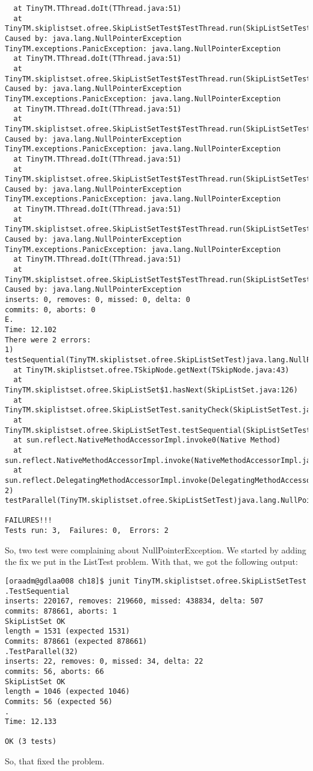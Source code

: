 \begin{verbatim}
  at TinyTM.TThread.doIt(TThread.java:51)
  at
TinyTM.skiplistset.ofree.SkipListSetTest$TestThread.run(SkipListSetTest.java:128)
Caused by: java.lang.NullPointerException
TinyTM.exceptions.PanicException: java.lang.NullPointerException
  at TinyTM.TThread.doIt(TThread.java:51)
  at
TinyTM.skiplistset.ofree.SkipListSetTest$TestThread.run(SkipListSetTest.java:128)
Caused by: java.lang.NullPointerException
TinyTM.exceptions.PanicException: java.lang.NullPointerException
  at TinyTM.TThread.doIt(TThread.java:51)
  at
TinyTM.skiplistset.ofree.SkipListSetTest$TestThread.run(SkipListSetTest.java:128)
Caused by: java.lang.NullPointerException
TinyTM.exceptions.PanicException: java.lang.NullPointerException
  at TinyTM.TThread.doIt(TThread.java:51)
  at
TinyTM.skiplistset.ofree.SkipListSetTest$TestThread.run(SkipListSetTest.java:128)
Caused by: java.lang.NullPointerException
TinyTM.exceptions.PanicException: java.lang.NullPointerException
  at TinyTM.TThread.doIt(TThread.java:51)
  at
TinyTM.skiplistset.ofree.SkipListSetTest$TestThread.run(SkipListSetTest.java:128)
Caused by: java.lang.NullPointerException
TinyTM.exceptions.PanicException: java.lang.NullPointerException
  at TinyTM.TThread.doIt(TThread.java:51)
  at
TinyTM.skiplistset.ofree.SkipListSetTest$TestThread.run(SkipListSetTest.java:128)
Caused by: java.lang.NullPointerException
inserts: 0, removes: 0, missed: 0, delta: 0
commits: 0, aborts: 0
E.
Time: 12.102
There were 2 errors:
1)
testSequential(TinyTM.skiplistset.ofree.SkipListSetTest)java.lang.NullPointerException
  at TinyTM.skiplistset.ofree.TSkipNode.getNext(TSkipNode.java:43)
  at TinyTM.skiplistset.ofree.SkipListSet$1.hasNext(SkipListSet.java:126)
  at
TinyTM.skiplistset.ofree.SkipListSetTest.sanityCheck(SkipListSetTest.java:181)
  at
TinyTM.skiplistset.ofree.SkipListSetTest.testSequential(SkipListSetTest.java:97)
  at sun.reflect.NativeMethodAccessorImpl.invoke0(Native Method)
  at
sun.reflect.NativeMethodAccessorImpl.invoke(NativeMethodAccessorImpl.java:57)
  at
sun.reflect.DelegatingMethodAccessorImpl.invoke(DelegatingMethodAccessorImpl.java:43)
2)
testParallel(TinyTM.skiplistset.ofree.SkipListSetTest)java.lang.NullPointerException

FAILURES!!!
Tests run: 3,  Failures: 0,  Errors: 2
\end{verbatim}
\hfill
\par
So, two test were complaining about NullPointerException. We started by adding
the fix we put in the ListTest problem. With that, we got the following output:
\par
\hfill
\begin{verbatim}
[oraadm@gdlaa008 ch18]$ junit TinyTM.skiplistset.ofree.SkipListSetTest
.TestSequential
inserts: 220167, removes: 219660, missed: 438834, delta: 507
commits: 878661, aborts: 1
SkipListSet OK
length = 1531 (expected 1531)
Commits: 878661 (expected 878661)
.TestParallel(32)
inserts: 22, removes: 0, missed: 34, delta: 22
commits: 56, aborts: 66
SkipListSet OK
length = 1046 (expected 1046)
Commits: 56 (expected 56)
.
Time: 12.133

OK (3 tests)
\end{verbatim}
\hfill
\par
So, that fixed the problem.
\par
